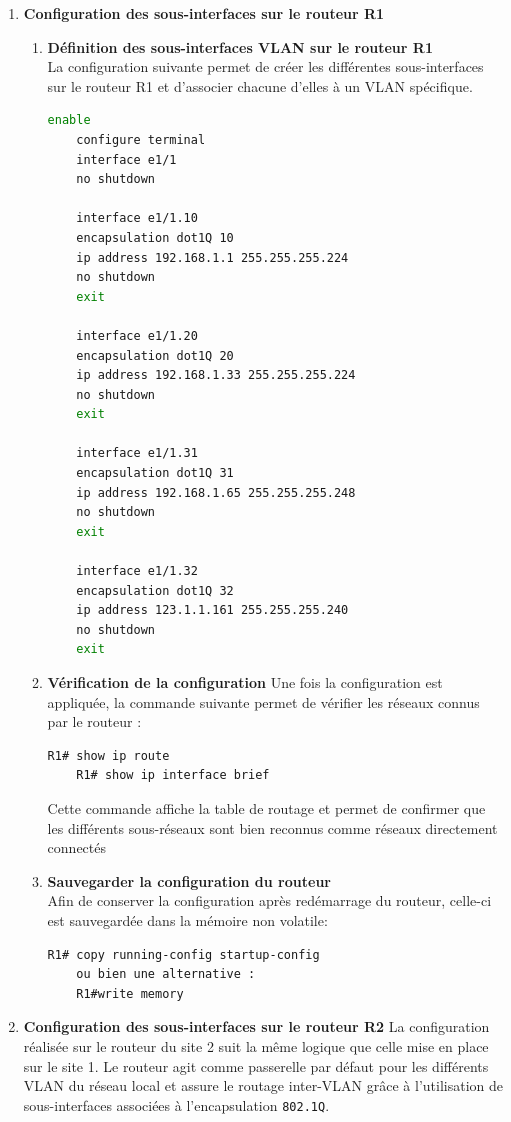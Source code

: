 \documentclass[12pt,a4paper, oneside]{memoir}
\begin{document}
\begin{enumerate}
	\item \textbf{Configuration des sous-interfaces sur le routeur R1}
\begin{enumerate}
	\item \textbf{Définition des sous-interfaces VLAN sur le routeur R1 \\} La configuration suivante permet de créer les différentes sous-interfaces sur le routeur R1 et d'associer chacune d'elles à un VLAN spécifique.
	
\begin{lstlisting}[language=bash,caption={Configuration des sous-interfaces sur R1}]
	enable
	configure terminal
	interface e1/1
	no shutdown
	
	interface e1/1.10
	encapsulation dot1Q 10
	ip address 192.168.1.1 255.255.255.224
	no shutdown
	exit
	
	interface e1/1.20
	encapsulation dot1Q 20
	ip address 192.168.1.33 255.255.255.224
	no shutdown
	exit
	
	interface e1/1.31
	encapsulation dot1Q 31
	ip address 192.168.1.65 255.255.255.248
	no shutdown
	exit
	
	interface e1/1.32
	encapsulation dot1Q 32
	ip address 123.1.1.161 255.255.255.240
	no shutdown
	exit
\end{lstlisting}
	
	\item \textbf{Vérification de la configuration }
	Une fois la configuration est appliquée, la commande suivante permet de vérifier les réseaux connus par le routeur :
\begin{lstlisting}[language=bash]
	R1# show ip route
	R1# show ip interface brief
\end{lstlisting}
	Cette commande affiche la table de routage et permet de confirmer que les différents sous-réseaux sont bien reconnus comme réseaux directement connectés
	\item \textbf{Sauvegarder la configuration du routeur \\}
	Afin de conserver la configuration après redémarrage du routeur, celle-ci est sauvegardée dans la mémoire non volatile:
	
\begin{lstlisting}[language=bash]
	R1# copy running-config startup-config
	ou bien une alternative : 
	R1#write memory
\end{lstlisting}	
	
\end{enumerate}

	\item \textbf{Configuration des sous-interfaces sur le routeur R2}
La configuration réalisée sur le routeur du site 2 suit la même logique que celle mise en place sur le site 1.  
Le routeur agit comme passerelle par défaut pour les différents VLAN du réseau local et assure le routage inter-VLAN grâce à l'utilisation de sous-interfaces associées à l'encapsulation \texttt{802.1Q}.


\end{enumerate}
\end{document}
